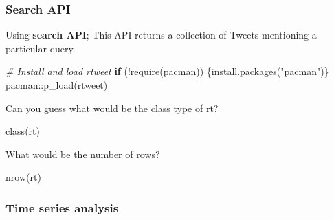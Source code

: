 \documentclass[
]{book}
\newenvironment{Shaded}{\begin{snugshade}}{\end{snugshade}}
\newcommand{\AttributeTok}[1]{\textcolor[rgb]{0.77,0.63,0.00}{#1}}
\newcommand{\CommentTok}[1]{\textcolor[rgb]{0.56,0.35,0.01}{\textit{#1}}}
\newcommand{\ConstantTok}[1]{\textcolor[rgb]{0.00,0.00,0.00}{#1}}
\newcommand{\ControlFlowTok}[1]{\textcolor[rgb]{0.13,0.29,0.53}{\textbf{#1}}}
\newcommand{\DecValTok}[1]{\textcolor[rgb]{0.00,0.00,0.81}{#1}}
\newcommand{\FunctionTok}[1]{\textcolor[rgb]{0.00,0.00,0.00}{#1}}
\newcommand{\NormalTok}[1]{#1}
\newcommand{\OtherTok}[1]{\textcolor[rgb]{0.56,0.35,0.01}{#1}}
\newcommand{\SpecialCharTok}[1]{\textcolor[rgb]{0.00,0.00,0.00}{#1}}
\newcommand{\StringTok}[1]{\textcolor[rgb]{0.31,0.60,0.02}{#1}}
\begin{document}
\hypertarget{search-api}{%
\subsubsection{Search API}\label{search-api}}

Using \textbf{search API}; This API returns a collection of Tweets mentioning a particular query.

\begin{Shaded}
\begin{Highlighting}[]
\CommentTok{\# Install and load rtweet }
\ControlFlowTok{if}\NormalTok{ (}\SpecialCharTok{!}\FunctionTok{require}\NormalTok{(pacman)) \{}\FunctionTok{install.packages}\NormalTok{(}\StringTok{"pacman"}\NormalTok{)\}}
\NormalTok{pacman}\SpecialCharTok{::}\FunctionTok{p\_load}\NormalTok{(rtweet)}
\end{Highlighting}
\end{Shaded}

\begin{Shaded}
\end{Shaded}

Can you guess what would be the class type of rt?

\begin{Shaded}
\begin{Highlighting}[]
\FunctionTok{class}\NormalTok{(rt)}
\end{Highlighting}
\end{Shaded}

What would be the number of rows?

\begin{Shaded}
\begin{Highlighting}[]
\FunctionTok{nrow}\NormalTok{(rt)}
\end{Highlighting}
\end{Shaded}

\hypertarget{time-series-analysis}{%
\subsubsection{Time series analysis}\label{time-series-analysis}}
\end{document}
